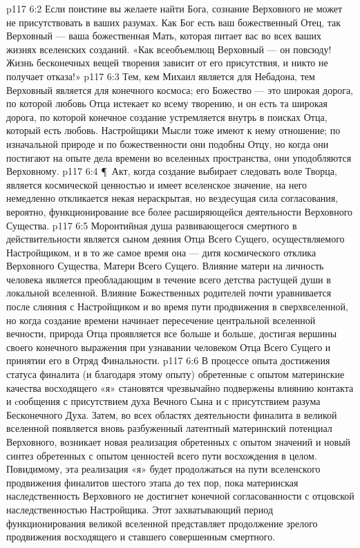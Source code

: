 \vs p117 6:2 Если поистине вы желаете найти Бога, сознание Верховного не может не присутствовать в ваших разумах. Как Бог есть ваш божественный Отец, так Верховный --- ваша божественная Мать, которая питает вас во всех ваших жизнях вселенских созданий. «Как всеобъемлющ Верховный --- он повсюду! Жизнь бесконечных вещей творения зависит от его присутствия, и никто не получает отказа!»
\vs p117 6:3 Тем, кем Михаил является для Небадона, тем Верховный является для конечного космоса; его Божество --- это широкая дорога, по которой любовь Отца истекает ко всему творению, и он есть та широкая дорога, по которой конечное создание устремляется внутрь в поисках Отца, который есть любовь. Настройщики Мысли тоже имеют к нему отношение; по изначальной природе и по божественности они подобны Отцу, но когда они постигают на опыте дела времени во вселенных пространства, они уподобляются Верховному.
\vs p117 6:4 \P\ Акт, когда создание выбирает следовать воле Творца, является космической ценностью и имеет вселенское значение, на него немедленно откликается некая нераскрытая, но вездесущая сила согласования, вероятно, функционирование все более расширяющейся деятельности Верховного Существа.
\vs p117 6:5 Моронтийная душа развивающегося смертного в действительности является сыном деяния Отца Всего Сущего, осуществляемого Настройщиком, и в то же самое время она --- дитя космического отклика Верховного Существа, Матери Всего Сущего. Влияние матери на личность человека является преобладающим в течение всего детства растущей души в локальной вселенной. Влияние Божественных родителей почти уравнивается после слияния с Настройщиком и во время пути продвижения в сверхвселенной, но когда создание времени начинает пересечение центральной вселенной вечности, природа Отца проявляется все больше и больше, достигая вершины своего конечного выражения при узнавании человеком Отца Всего Сущего и принятии его в Отряд Финальности.
\vs p117 6:6 В процессе опыта достижения статуса финалита (и благодаря этому опыту) обретенные с опытом материнские качества восходящего «я» становятся чрезвычайно подвержены влиянию контакта и cообщения с присутствием духа Вечного Сына и с присутствием разума Бесконечного Духа. Затем, во всех областях деятельности финалита в великой вселенной появляется вновь разбуженный латентный материнский потенциал Верховного, возникает новая реализация обретенных с опытом значений и новый синтез обретенных с опытом ценностей всего пути восхождения в целом. Повидимому, эта реализация «я» будет продолжаться на пути вселенского продвижения финалитов шестого этапа до тех пор, пока материнская наследственность Верховного не достигнет конечной согласованности с отцовской наследственностью Настройщика. Этот захватывающий период функционирования великой вселенной представляет продолжение зрелого продвижения восходящего и ставшего совершенным смертного.
